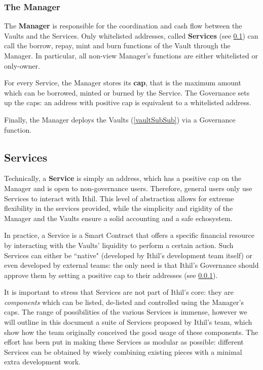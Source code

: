 \documentclass[a4paper,10 pt]{article}
\theoremstyle{definition}
\begin{document}
\subsubsection{The Manager}\label{managerSubSub}

The {\bf Manager} is responsible for the coordination and cash flow between the Vaults and the Services. Only whitelisted addresses, called {\bf Services} (see \ref{servicesSub}) can call the borrow, repay, mint and burn functions of the Vault through the Manager. In particular, all non-view Manager's functions are either whitelisted or only-owner.

For every Service, the Manager stores its {\bf cap}, that is the maximum amount which can be borrowed, minted or burned by the Service. The Governance sets up the caps: an address with positive cap is equivalent to a whitelisted address.

Finally, the Manager deploys the Vaults (\ref{vaultSubSub}) via a Governance function.

\subsection{Services}\label{servicesSub}

Technically, a {\bf Service} is simply an address, which has a positive cap on the Manager and is open to non-governance users. Therefore, general users only use Services to interact with Ithil. This level of abstraction allows for extreme flexibility in the services provided, while the simplicity and rigidity of the Manager and the Vaults ensure a solid accounting and a safe echosystem.

In practice, a Service is a Smart Contract that offers a specific financial resource by interacting with the Vaults' liquidity to perform a certain action. Such Services can either be ``native" (developed by Ithil's development team itself) or even developed by external teams: the only need is that Ithil's Governance should approve them by setting a positive cap to their addresses (see \ref{managerSubSub}).

It is important to stress that Services are not part of Ithil's core: they are {\it components} which can be listed, de-listed and controlled using the Manager's caps. The range of possibilities of the various Services is immense, however we will outline in this document a suite of Services proposed by Ithil's team, which show how the team originally conceived the good usage of these components. The effort has been put in making these Services as modular as possible: different Services can be obtained by wisely combining existing pieces with a minimal extra development work.
\end{document}
